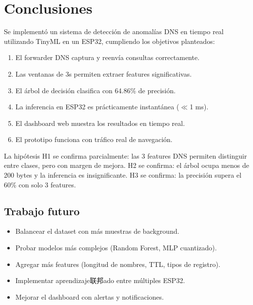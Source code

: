 \documentclass[12pt,a4paper]{article}
\begin{document}
\section{Conclusiones}
\label{sec:conclusiones}

Se implementó un sistema de detección de anomalías DNS en tiempo real utilizando TinyML en un ESP32, cumpliendo los objetivos planteados:

\begin{enumerate}
    \item El forwarder DNS captura y reenvía consultas correctamente.
    \item Las ventanas de 3s permiten extraer features significativas.
    \item El árbol de decisión clasifica con 64.86\% de precisión.
    \item La inferencia en ESP32 es prácticamente instantánea ($\ll$1 ms).
    \item El dashboard web muestra los resultados en tiempo real.
    \item El prototipo funciona con tráfico real de navegación.
\end{enumerate}

La hipótesis H1 se confirma parcialmente: las 3 features DNS permiten distinguir entre clases, pero con margen de mejora. H2 se confirma: el árbol ocupa menos de 200 bytes y la inferencia es insignificante. H3 se confirma: la precisión supera el 60\% con solo 3 features.

\subsection{Trabajo futuro}
\label{sec:futuro}

\begin{itemize}
    \item Balancear el dataset con más muestras de background.
    \item Probar modelos más complejos (Random Forest, MLP cuantizado).
    \item Agregar más features (longitud de nombres, TTL, tipos de registro).
    \item Implementar aprendizaje联邦ado entre múltiples ESP32.
    \item Mejorar el dashboard con alertas y notificaciones.
\end{itemize}
\end{document}
